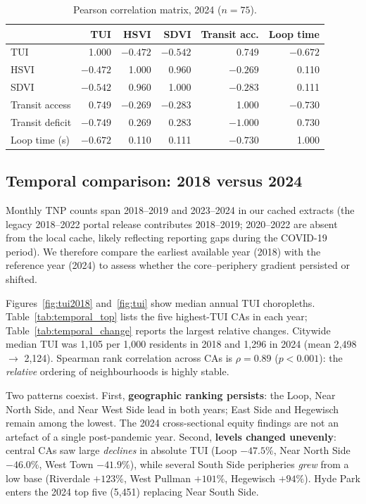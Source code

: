 \documentclass[10pt, a4paper]{article}
\begin{document}
\begin{table}[htbp]
    \centering
    \caption{Pearson correlation matrix, 2024 ($n=75$).}
    \label{tab:corr_matrix}
    \small
    \begin{tabular}{|l|r|r|r|r|r|}
        \hline
        & \textbf{TUI} & \textbf{HSVI} & \textbf{SDVI} & \textbf{Transit acc.} & \textbf{Loop time} \\
        \hline
        TUI            &  1.000 & $-0.472$ & $-0.542$ &  0.749 & $-0.672$ \\
        HSVI           & $-0.472$ &  1.000 &  0.960 & $-0.269$ &  0.110 \\
        SDVI           & $-0.542$ &  0.960 &  1.000 & $-0.283$ &  0.111 \\
        Transit access &  0.749 & $-0.269$ & $-0.283$ &  1.000 & $-0.730$ \\
        Transit deficit& $-0.749$ &  0.269 &  0.283 & $-1.000$ &  0.730 \\
        Loop time (s)  & $-0.672$ &  0.110 &  0.111 & $-0.730$ &  1.000 \\
        \hline
    \end{tabular}
\end{table}

\subsection{Temporal comparison: 2018 versus 2024}\label{sec:temporal}
Monthly TNP counts span 2018--2019 and 2023--2024 in our cached extracts (the legacy 2018--2022 portal release contributes 2018--2019; 2020--2022 are absent from the local cache, likely reflecting reporting gaps during the COVID-19 period). We therefore compare the earliest available year (2018) with the reference year (2024) to assess whether the core--periphery gradient persisted or shifted.

Figures~\ref{fig:tui2018} and~\ref{fig:tui} show median annual TUI choropleths. Table~\ref{tab:temporal_top} lists the five highest-TUI CAs in each year; Table~\ref{tab:temporal_change} reports the largest relative changes. Citywide median TUI was 1{,}105 per 1{,}000 residents in 2018 and 1{,}296 in 2024 (mean 2{,}498 $\to$ 2{,}124). Spearman rank correlation across CAs is $\rho=0.89$ ($p<0.001$): the \emph{relative} ordering of neighbourhoods is highly stable.

Two patterns coexist. First, \textbf{geographic ranking persists}: the Loop, Near North Side, and Near West Side lead in both years; East Side and Hegewisch remain among the lowest. The 2024 cross-sectional equity findings are not an artefact of a single post-pandemic year. Second, \textbf{levels changed unevenly}: central CAs saw large \emph{declines} in absolute TUI (Loop $-47.5\%$, Near North Side $-46.0\%$, West Town $-41.9\%$), while several South Side peripheries \emph{grew} from a low base (Riverdale $+123\%$, West Pullman $+101\%$, Hegewisch $+94\%$). Hyde Park enters the 2024 top five (5{,}451) replacing Near South Side.
\end{document}

